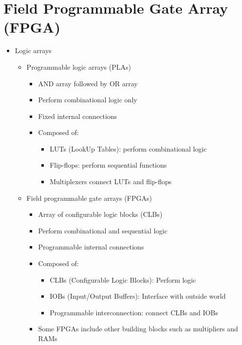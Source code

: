 \documentclass[a4paper]{article}
\begin{document}
\section{Field Programmable Gate Array (FPGA)}
\begin{itemize}
\item Logic arrays
\begin{itemize}
\item Programmable logic arrays (PLAs)
\begin{itemize}
\item AND array followed by OR array
\item Perform combinational logic only
\item Fixed internal connections
\item Composed of:
\begin{itemize}
\item LUTs (LookUp Tables): perform combinational logic
\item Flip-flops: perform sequential functions
\item Multiplexers connect LUTs and flip-flops
\end{itemize}
\end{itemize}
\item Field programmable gate arrays (FPGAs)
\begin{itemize}
\item Array of configurable logic blocks (CLBs)
\item Perform combinational and sequential logic
\item Programmable internal connections
\item Composed of:
\begin{itemize}
\item CLBs (Configurable Logic Blocks): Perform logic
\item IOBs (Input/Output Buffers): Interface with outside world
\item Programmable interconnection: connect CLBs and IOBs
\end{itemize}
\item Some FPGAs include other building blocks such as multipliers and RAMs
\end{itemize}
\end{itemize}
\end{itemize}
\end{document}
